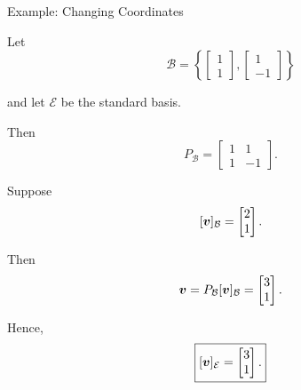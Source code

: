 \begin{frame}{Example: Changing Coordinates}

Let
\vspace{-0.2cm}
\[
\mathcal{B}
=
\left\{
\begin{bmatrix}
1\\1
\end{bmatrix},
\begin{bmatrix}
1\\-1
\end{bmatrix}
\right\}
\]

and let $\mathcal{E}$ be the standard basis.

Then
\vspace{-0.4cm}
\[
P_{\mathcal{B}}
=
\begin{bmatrix}
1&1\\
1&-1
\end{bmatrix}.
\]
\vspace{-0.4cm}

Suppose
\vspace{-0.1cm}
\[
[\bm{v}]_{\mathcal{B}}
=
\begin{bmatrix}
2\\1
\end{bmatrix}.
\]
\vspace{-0.4cm}

Then
\vspace{-0.1cm}
\[
\bm{v}
=
P_{\mathcal{B}}[\bm{v}]_{\mathcal{B}}
=
\begin{bmatrix}
3\\1
\end{bmatrix}.
\]
\vspace{-0.4cm}

Hence,
\vspace{-0.1cm}
\[
\boxed{
[\bm{v}]_{\mathcal{E}}
=
\begin{bmatrix}
3\\1
\end{bmatrix}.
}
\]

\end{frame}



